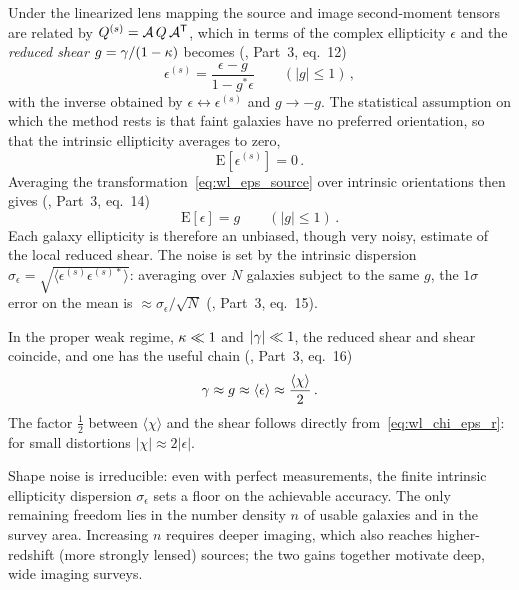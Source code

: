 Under the linearized lens mapping the source and image second-moment
tensors are related by $Q^{(s)} = \mathcal{A}\, Q\, \mathcal{A}^{\mathsf T}$, which in
terms of the complex ellipticity $\epsilon$ and the \emph{reduced shear}
$g = \gamma/(1 - \kappa)$ becomes
(\citealp{schneider_kochanek_wambsganss_2006}, Part~3, eq.~12)
\begin{equation}
    \epsilon^{(s)} = \frac{\epsilon - g}{1 - g^*\epsilon}
    \qquad (|g| \le 1)\,,
    \label{eq:wl_eps_source}
\end{equation}
with the inverse obtained by $\epsilon \leftrightarrow \epsilon^{(s)}$ and
$g \to -g$.  The statistical assumption on which the method rests is that
faint galaxies have no preferred orientation, so that the intrinsic
ellipticity averages to zero,
\begin{equation}
    \mathrm{E}\!\left[\epsilon^{(s)}\right] = 0\,.
    \label{eq:wl_random_orientation}
\end{equation}
Averaging the transformation~\eqref{eq:wl_eps_source} over intrinsic
orientations then gives
(\citealp{schneider_kochanek_wambsganss_2006}, Part~3, eq.~14)
\begin{equation}
    \boxed{
    \mathrm{E}[\epsilon] = g
    \qquad (|g| \le 1)\,.
    }
    \label{eq:wl_expectation_eps}
\end{equation}
Each galaxy ellipticity is therefore an unbiased, though very noisy,
estimate of the local reduced shear.  The noise is set by the intrinsic
dispersion $\sigma_\epsilon = \sqrt{\langle \epsilon^{(s)}\epsilon^{(s)*}
\rangle}$: averaging over $N$ galaxies subject to the same $g$, the
$1\sigma$ error on the mean is
$\approx \sigma_\epsilon/\sqrt{N}$
(\citealp{schneider_kochanek_wambsganss_2006}, Part~3, eq.~15).

In the proper weak regime, $\kappa \ll 1$ and $|\gamma| \ll 1$, the
reduced shear and shear coincide, and one has the useful chain
(\citealp{schneider_kochanek_wambsganss_2006}, Part~3, eq.~16)
\begin{equation}
    \gamma \approx g \approx \langle \epsilon \rangle
    \approx \frac{\langle \chi \rangle}{2}\,.
    \label{eq:wl_weak_chain}
\end{equation}
The factor $\tfrac{1}{2}$ between $\langle\chi\rangle$ and the shear
follows directly from~\eqref{eq:wl_chi_eps_r}: for small distortions
$|\chi| \approx 2|\epsilon|$.

\begin{remark}
Shape noise is irreducible: even with perfect measurements, the finite
intrinsic ellipticity dispersion $\sigma_\epsilon$ sets a floor on the
achievable accuracy.  The only remaining freedom lies in the number
density $n$ of usable galaxies and in the survey area.  Increasing $n$
requires deeper imaging, which also reaches higher-redshift (more strongly
lensed) sources; the two gains together motivate deep, wide imaging
surveys.
\end{remark}


